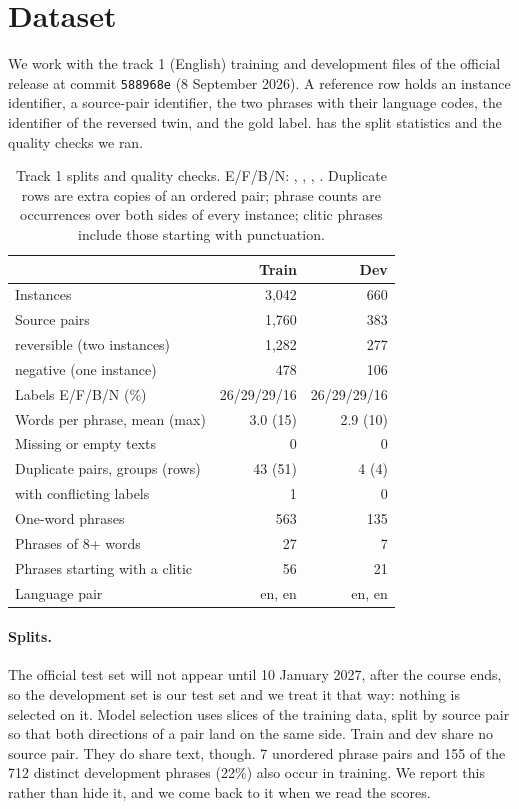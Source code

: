 \section{Dataset}
\label{sec:dataset}

We work with the track 1 (English) training and development files of the official release at commit \texttt{588968e} (8 September 2026). A reference row holds an instance identifier, a source-pair identifier, the two phrases with their language codes, the identifier of the reversed twin, and the gold label.  has the split statistics and the quality checks we ran.

\begin{table}[t]
\centering
\footnotesize
\setlength{\tabcolsep}{4pt}
\begin{tabular}{@{}lrr@{}}
\toprule
 & Train & Dev \\
\midrule
Instances & 3,042 & 660 \\
Source pairs & 1,760 & 383 \\
\quad reversible (two instances) & 1,282 & 277 \\
\quad negative (one instance) & 478 & 106 \\
Labels E/F/B/N (\%) & 26/29/29/16 & 26/29/29/16 \\
Words per phrase, mean (max) & 3.0 (15) & 2.9 (10) \\
\midrule
Missing or empty texts & 0 & 0 \\
Duplicate pairs, groups (rows) & 43 (51) & 4 (4) \\
\quad with conflicting labels & 1 & 0 \\
One-word phrases & 563 & 135 \\
Phrases of 8+ words & 27 & 7 \\
Phrases starting with a clitic & 56 & 21 \\
Language pair & en, en & en, en \\
\bottomrule
\end{tabular}
\caption{Track 1 splits and quality checks. E/F/B/N: \EQ, \FW, \BW, \NO. Duplicate rows are extra copies of an ordered pair; phrase counts are occurrences over both sides of every instance; clitic phrases include those starting with punctuation.}
\label{tab:dataset}
\end{table}

\paragraph{Splits.}
The official test set will not appear until 10 January 2027, after the course ends, so the development set is our test set and we treat it that way: nothing is selected on it. Model selection uses slices of the training data, split by source pair so that both directions of a pair land on the same side. Train and dev share no source pair. They do share text, though. 7 unordered phrase pairs and 155 of the 712 distinct development phrases (22\%) also occur in training. We report this rather than hide it, and we come back to it when we read the scores.

